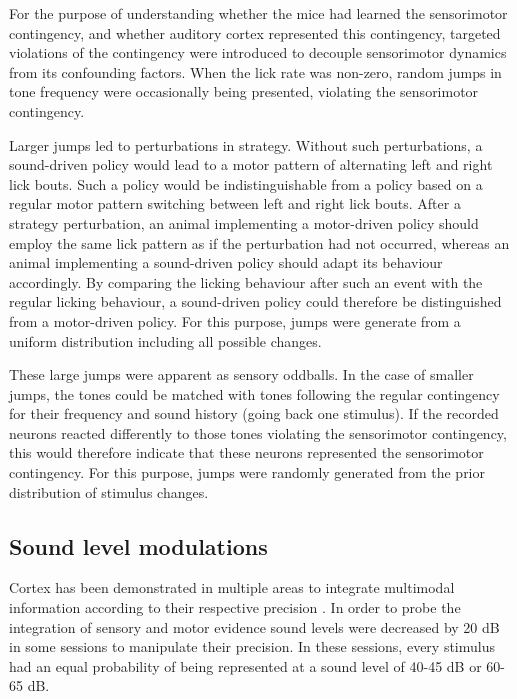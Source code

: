 \documentclass[]{report}
\theoremstyle{definition}
\theoremstyle{definition}
\theoremstyle{definition}
\theoremstyle{remark}
\begin{document}
For the purpose of understanding whether the mice had learned the
sensorimotor contingency, and whether auditory cortex represented this
contingency, targeted violations of the contingency were introduced to
decouple sensorimotor dynamics from its confounding factors. When the
lick rate was non-zero, random jumps in tone frequency were occasionally
being presented, violating the sensorimotor contingency.

Larger jumps led to perturbations in strategy. Without such
perturbations, a sound-driven policy would lead to a motor pattern of
alternating left and right lick bouts. Such a policy would be
indistinguishable from a policy based on a regular motor pattern
switching between left and right lick bouts. After a strategy
perturbation, an animal implementing a motor-driven policy should employ
the same lick pattern as if the perturbation had not occurred, whereas
an animal implementing a sound-driven policy should adapt its behaviour
accordingly. By comparing the licking behaviour after such an event with
the regular licking behaviour, a sound-driven policy could therefore be
distinguished from a motor-driven policy. For this purpose, jumps were
generate from a uniform distribution including all possible changes.

These large jumps were apparent as sensory oddballs. In the case of
smaller jumps, the tones could be matched with tones following the
regular contingency for their frequency and sound history (going back
one stimulus). If the recorded neurons reacted differently to those
tones violating the sensorimotor contingency, this would therefore
indicate that these neurons represented the sensorimotor contingency.
For this purpose, jumps were randomly generated from the prior
distribution of stimulus changes.

\hypertarget{sound-level-modulations}{%
\subsection{Sound level modulations}\label{sound-level-modulations}}

Cortex has been demonstrated in multiple areas to integrate multimodal
information according to their respective precision
\citep{kording2004bayesian}. In order to probe the integration of
sensory and motor evidence sound levels were decreased by 20 dB in some
sessions to manipulate their precision. In these sessions, every
stimulus had an equal probability of being represented at a sound level
of 40-45 dB or 60-65 dB.
\end{document}

